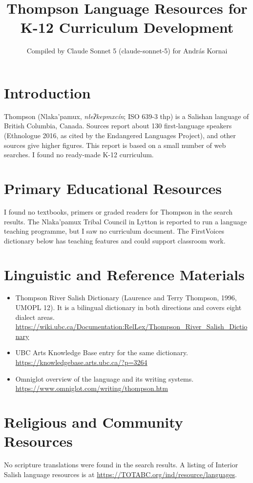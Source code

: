 \documentclass[12pt]{article}
\title{Thompson Language Resources for K-12 Curriculum Development}
\author{Compiled by Claude Sonnet 5 (claude-sonnet-5) for Andr\'as Kornai}
\date{}
\begin{document}
\maketitle

\section{Introduction}
Thompson (Nlaka'pamux, \textit{nłeʔkepmxcín}; ISO 639-3 thp) is a Salishan language of British Columbia, Canada. Sources report about 130 first-language speakers (Ethnologue 2016, as cited by the Endangered Languages Project), and other sources give higher figures. This report is based on a small number of web searches. I found no ready-made K-12 curriculum.

\section{Primary Educational Resources}
I found no textbooks, primers or graded readers for Thompson in the search results. The Nlaka'pamux Tribal Council in Lytton is reported to run a language teaching programme, but I saw no curriculum document. The FirstVoices dictionary below has teaching features and could support classroom work.

\section{Linguistic and Reference Materials}
\begin{itemize}
\item Thompson River Salish Dictionary (Laurence and Terry Thompson, 1996, UMOPL 12). It is a bilingual dictionary in both directions and covers eight dialect areas. \url{https://wiki.ubc.ca/Documentation:RelLex/Thompson_River_Salish_Dictionary}
\item UBC Arts Knowledge Base entry for the same dictionary. \url{https://knowledgebase.arts.ubc.ca/?p=3264}
\item Omniglot overview of the language and its writing systems. \url{https://www.omniglot.com/writing/thompson.htm}
\end{itemize}

\section{Religious and Community Resources}
No scripture translations were found in the search results. A listing of Interior Salish language resources is at \url{https://TOTABC.org/ind/resource/languages}.
\end{document}
